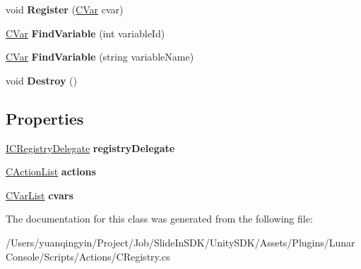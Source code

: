 \begin{DoxyCompactItemize}
\item 
\mbox{\label{class_lunar_console_plugin_internal_1_1_c_registry_a70d7a4aa6c91997259271f9c63ef6417}} 
void {\bfseries Register} (\mbox{\hyperlink{class_lunar_console_plugin_1_1_c_var}{C\+Var}} cvar)
\item 
\mbox{\label{class_lunar_console_plugin_internal_1_1_c_registry_a10fa48f7f2e9c37642abec94bfd3e6fa}} 
\mbox{\hyperlink{class_lunar_console_plugin_1_1_c_var}{C\+Var}} {\bfseries Find\+Variable} (int variable\+Id)
\item 
\mbox{\label{class_lunar_console_plugin_internal_1_1_c_registry_a5d9c726749feb321d970bdeae16f51ce}} 
\mbox{\hyperlink{class_lunar_console_plugin_1_1_c_var}{C\+Var}} {\bfseries Find\+Variable} (string variable\+Name)
\item 
\mbox{\label{class_lunar_console_plugin_internal_1_1_c_registry_a2aee2177e6921c5e9e942fb3ea38bbdd}} 
void {\bfseries Destroy} ()
\end{DoxyCompactItemize}
\subsection*{Properties}
\begin{DoxyCompactItemize}
\item 
\mbox{\label{class_lunar_console_plugin_internal_1_1_c_registry_a77856a6e08094a03930215ffd19eff27}} 
\mbox{\hyperlink{interface_lunar_console_plugin_internal_1_1_i_c_registry_delegate}{I\+C\+Registry\+Delegate}} {\bfseries registry\+Delegate}
\item 
\mbox{\label{class_lunar_console_plugin_internal_1_1_c_registry_a9db8ae60efd311b605e3d5039b30677e}} 
\mbox{\hyperlink{class_lunar_console_plugin_internal_1_1_c_action_list}{C\+Action\+List}} {\bfseries actions}
\item 
\mbox{\label{class_lunar_console_plugin_internal_1_1_c_registry_ab8887dc2cb552c4e0badf85780073e89}} 
\mbox{\hyperlink{class_lunar_console_plugin_1_1_c_var_list}{C\+Var\+List}} {\bfseries cvars}
\end{DoxyCompactItemize}


The documentation for this class was generated from the following file\+:\begin{DoxyCompactItemize}
\item 
/\+Users/yuanqingyin/\+Project/\+Job/\+Slide\+In\+S\+D\+K/\+Unity\+S\+D\+K/\+Assets/\+Plugins/\+Lunar\+Console/\+Scripts/\+Actions/C\+Registry.\+cs\end{DoxyCompactItemize}
